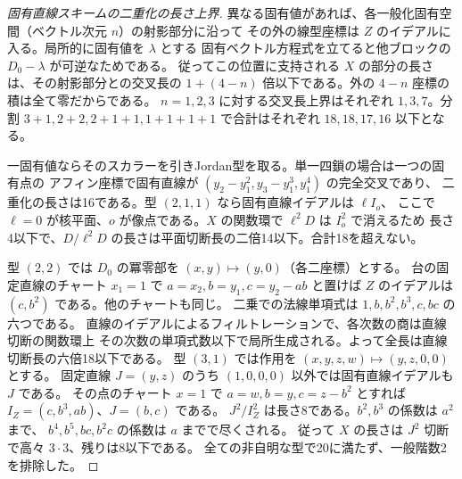\begin{proof}[固有直線スキームの二重化の長さ上界]
異なる固有値があれば、各一般化固有空間（ベクトル次元 $n$）の射影部分に沿って
その外の線型座標は $Z$ のイデアルに入る。局所的に固有値を $\lambda$ とする
固有ベクトル方程式を立てると他ブロックの $D_0-\lambda$ が可逆なためである。
従ってこの位置に支持される $X$ の部分の長さは、その射影部分との交叉長の
$1+(4-n)$ 倍以下である。外の $4-n$ 座標の積は全て零だからである。
$n=1,2,3$ に対する交叉長上界はそれぞれ $1,3,7$。分割
$3+1,2+2,2+1+1,1+1+1+1$ で合計はそれぞれ $18,18,17,16$ 以下となる。

一固有値ならそのスカラーを引きJordan型を取る。単一四鎖の場合は一つの固有点の
アフィン座標で固有直線が $(y_2-y_1^2,y_3-y_1^3,y_1^4)$ の完全交叉であり、
二重化の長さは16である。型 $(2,1,1)$ なら固有直線イデアルは $\ell I_o$、
ここで $\ell=0$ が核平面、$o$ が像点である。$X$ の関数環で $\ell^2D$ は $I_o^2$ で消えるため
長さ4以下で、$D/\ell^2 D$ の長さは平面切断長の二倍14以下。合計18を超えない。

型 $(2,2)$ では $D_0$ の冪零部を $(x,y)\mapsto(y,0)$（各二座標）とする。
台の固定直線のチャート $x_1=1$ で $a=x_2,b=y_1,c=y_2-a b$ と置けば
$Z$ のイデアルは $(c,b^2)$ である。他のチャートも同じ。
二乗での法線単項式は $1,b,b^2,b^3,c,bc$ の六つである。
直線のイデアルによるフィルトレーションで、各次数の商は直線切断の関数環上
その次数の単項式数以下で局所生成される。よって全長は直線切断長の六倍18以下である。
型 $(3,1)$ では作用を $(x,y,z,w)\mapsto(y,z,0,0)$ とする。
固定直線 $J=(y,z)$ のうち $(1,0,0,0)$ 以外では固有直線イデアルも $J$ である。
その点のチャート $x=1$ で $a=w,b=y,c=z-b^2$ とすれば $I_Z=(c,b^3,ab)$、$J=(b,c)$ である。
$J^2/I_Z^2$ は長さ8である。$b^2,b^3$ の係数は $a^2$ まで、
$b^4,b^5,bc,b^2c$ の係数は $a$ までで尽くされる。
従って $X$ の長さは $J^2$ 切断で高々 $3\cdot3$、残りは8以下である。
全ての非自明な型で20に満たず、一般階数2を排除した。
\end{proof}


